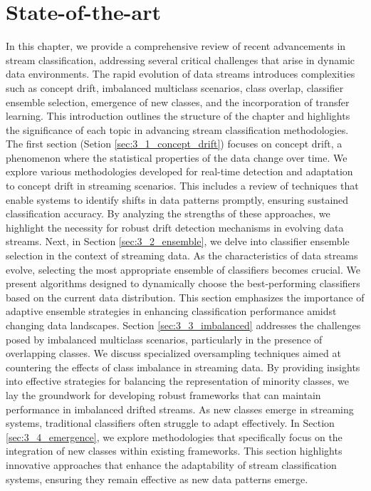 \chapter{State-of-the-art}
\label{cha:3_State-of-the-art}


In this chapter, we provide a comprehensive review of recent advancements in stream classification, addressing several critical challenges that arise in dynamic data environments. The rapid evolution of data streams introduces complexities such as concept drift, imbalanced multiclass scenarios, class overlap, classifier ensemble selection, emergence of new classes, and the incorporation of transfer learning. This introduction outlines the structure of the chapter and highlights the significance of each topic in advancing stream classification methodologies.
The first section (Setion \ref{sec:3_1_concept_drift}) focuses on concept drift, a phenomenon where the statistical properties of the data change over time. We explore various methodologies developed for real-time detection and adaptation to concept drift in streaming scenarios. This includes a review of techniques that enable systems to identify shifts in data patterns promptly, ensuring sustained classification accuracy. By analyzing the strengths of these approaches, we highlight the necessity for robust drift detection mechanisms in evolving data streams.
Next, in Section \ref{sec:3_2_ensemble}, we delve into classifier ensemble selection in the context of streaming data. As the characteristics of data streams evolve, selecting the most appropriate ensemble of classifiers becomes crucial. We present algorithms designed to dynamically choose the best-performing classifiers based on the current data distribution. This section emphasizes the importance of adaptive ensemble strategies in enhancing classification performance amidst changing data landscapes.
Section \ref{sec:3_3_imbalanced} addresses the challenges posed by imbalanced multiclass scenarios, particularly in the presence of overlapping classes. We discuss specialized oversampling techniques aimed at countering the effects of class imbalance in streaming data. By providing insights into effective strategies for balancing the representation of minority classes, we lay the groundwork for developing robust frameworks that can maintain performance in imbalanced drifted streams.
As new classes emerge in streaming systems, traditional classifiers often struggle to adapt effectively. In Section \ref{sec:3_4_emergence}, we explore methodologies that specifically focus on the integration of new classes within existing frameworks. This section highlights innovative approaches that enhance the adaptability of stream classification systems, ensuring they remain effective as new data patterns emerge.
